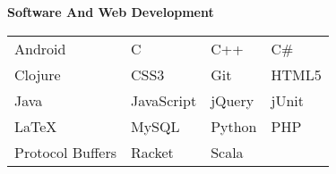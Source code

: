 \documentclass[margin=1in, 10pt]{res}
\begin{document}
\begin{resume}
	\vspace{1pt}

\textbf{Software And Web Development} \\
	\begin{tabular}{  l    l    l    l  }
		Android	           &   C 	     			&    C++ 			&   C\# 	\\ 
		Clojure 			& 	CSS3 	 		& 	Git	 			& 	HTML5  \\
	     Java  				& 	JavaScript 		&	jQuery            &   jUnit  	 \\
		LaTeX   			&   MySQL 			&	Python       	&	PHP  	 \\	   
  	 	Protocol Buffers   	& 	Racket         	&	Scala			&				
	\end{tabular}
	
	
\end{resume}
\end{document}
